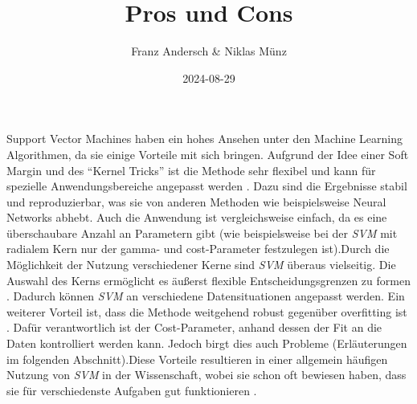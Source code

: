 \documentclass[
]{article}
\title{Pros und Cons}
\author{Franz Andersch \& Niklas Münz}
\date{2024-08-29}
\renewcommand{\maketitle}{}
\begin{document}
\maketitle

Support Vector Machines haben ein hohes Ansehen unter den Machine
Learning Algorithmen, da sie einige Vorteile mit sich bringen. Aufgrund
der Idee einer Soft Margin und des ``Kernel Tricks'' ist die Methode
sehr flexibel und kann für spezielle Anwendungsbereiche angepasst werden
\parencite{bennettSupportVectorMachines2000}. Dazu sind die Ergebnisse
stabil und reproduzierbar, was sie von anderen Methoden wie
beispielsweise Neural Networks abhebt. Auch die Anwendung ist
vergleichsweise einfach, da es eine überschaubare Anzahl an Parametern
gibt (wie beispielsweise bei der \textit{SVM} mit radialem Kern nur der
gamma- und cost-Parameter festzulegen ist).\newline Durch die
Möglichkeit der Nutzung verschiedener Kerne sind \textit{SVM} überaus
vielseitig. Die Auswahl des Kerns ermöglicht es äußerst flexible
Entscheidungsgrenzen zu formen
\parencite{kuhnAppliedPredictiveModeling2013}. Dadurch können
\textit{SVM} an verschiedene Datensituationen angepasst werden.\newline
Ein weiterer Vorteil ist, dass die Methode weitgehend robust gegenüber
overfitting ist \parencite{kuhnAppliedPredictiveModeling2013}. Dafür
verantwortlich ist der Cost-Parameter, anhand dessen der Fit an die
Daten kontrolliert werden kann. Jedoch birgt dies auch Probleme
(Erläuterungen im folgenden Abschnitt).\newline Diese Vorteile
resultieren in einer allgemein häufigen Nutzung von \textit{SVM} in der
Wissenschaft, wobei sie schon oft bewiesen haben, dass sie für
verschiedenste Aufgaben gut funktionieren
\parencite{kuhnAppliedPredictiveModeling2013}.
\end{document}
